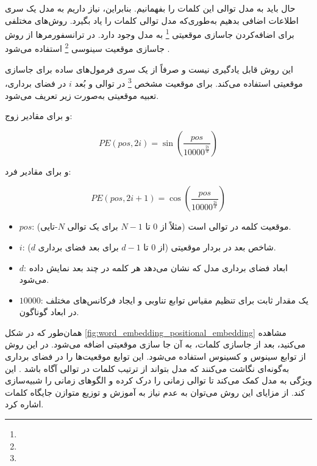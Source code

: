 حال باید به مدل توالی این کلمات را بفهمانیم. بنابراین، نیاز داریم به مدل یک سری اطلاعات اضافی بدهیم به‌طوری‌که مدل توالی کلمات را یاد بگیرد. روش‌های مختلفی برای اضافه‌کردن جاسازی موقعیتی \footnote{} به مدل وجود دارد. در ترانسفورمرها از روش جاسازی موقعیت سینوسی
 \footnote{} استفاده می‌شود \cite{vaswani2017attention}.



این روش قابل یادگیری نیست و صرفاً از یک سری فرمول‌های ساده برای جاسازی موقعیتی استفاده می‌کند.  
برای موقعیت مشخص \footnote{} در توالی و بُعد \( i \) در فضای برداری، تعبیه موقعیتی به‌صورت زیر تعریف می‌شود.  

و برای مقادیر زوج:  

\begin{equation}
	PE(pos, 2i) = \sin\left( \frac{pos}{10000^{\frac{2i}{d}}} \right)
	\label{eq:pe_even}
\end{equation}

و برای مقادیر فرد:  

\begin{equation}
	PE(pos, 2i+1) = \cos\left( \frac{pos}{10000^{\frac{2i}{d}}} \right)
	\label{eq:pe_odd}
\end{equation}
	



\begin{itemize}
	\item \( pos \): موقعیت کلمه در توالی است (مثلاً از \( 0 \) تا \( N-1 \) برای یک توالی \( N \)-تایی).
	\item \( i \): شاخص بعد در بردار موقعیتی (از \( 0 \) تا \( d-1 \) برای بعد فضای برداری \( d \)).
	\item \( d \): ابعاد فضای برداری مدل که نشان می‌دهد هر کلمه در چند بعد نمایش داده می‌شود.
	\item \( 10000 \): یک مقدار ثابت برای تنظیم مقیاس توابع تناوبی و ایجاد فرکانس‌های مختلف در ابعاد گوناگون.
\end{itemize}  

همان‌طور که در شکل \autoref{fig:word_embedding_positional_embedding} مشاهده می‌کنید، بعد از جاسازی کلمات، به آن جا سازی موقعیتی اضافه می‌شود. در این روش از توابع سینوس و کسینوس استفاده می‌شود. این توابع موقعیت‌ها را در فضای برداری به‌گونه‌ای نگاشت می‌کنند که مدل بتواند از ترتیب کلمات در توالی آگاه باشد \cite{vaswani2017attention}. این ویژگی به مدل کمک می‌کند تا توالی زمانی را درک کرده و الگوهای زمانی را شبیه‌سازی کند. از مزایای این روش می‌توان به عدم نیاز به آموزش و توزیع متوازن جایگاه کلمات اشاره کرد.

